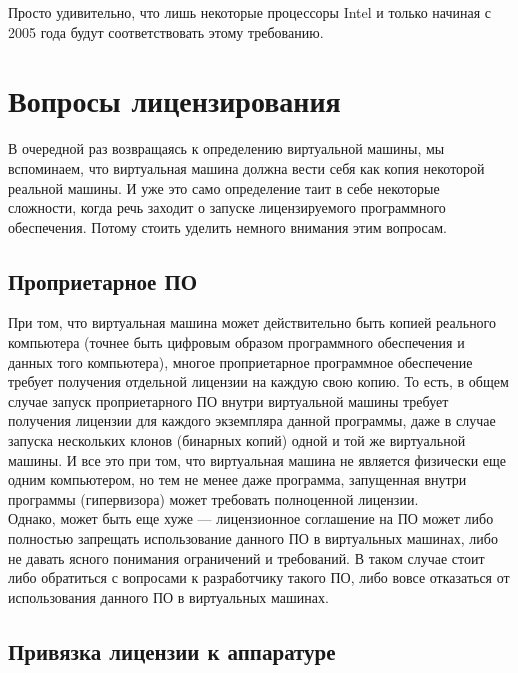 \documentclass[14pt, a4paper]{article}
\begin{document}
Просто удивительно, что лишь некоторые процессоры Intel и только начиная с 2005
года будут соответствовать этому требованию.

\section*{Вопросы лицензирования}

В очередной раз возвращаясь к определению виртуальной машины, мы вспоминаем,
что виртуальная машина должна вести себя как копия некоторой реальной машины. И
уже это само определение таит в себе некоторые сложности, когда речь заходит о
запуске лицензируемого программного обеспечения. Потому стоить уделить немного
внимания этим вопросам.\\

\subsection*{Проприетарное ПО}

При том, что виртуальная машина может действительно быть копией реального
компьютера (точнее быть цифровым образом программного обеспечения и данных
того компьютера), многое проприетарное программное обеспечение требует получения
отдельной лицензии на каждую свою копию. То есть, в общем случае запуск
проприетарного ПО внутри виртуальной машины требует получения лицензии для
каждого экземпляра данной программы, даже в случае запуска нескольких клонов
(бинарных копий) одной и той же виртуальной машины. И все это при том, что
виртуальная машина не является физически еще одним компьютером, но тем не
менее даже программа, запущенная внутри программы (гипервизора) может требовать
полноценной лицензии.\\

Однако, может быть еще хуже — лицензионное соглашение на ПО может либо
полностью запрещать использование данного ПО в виртуальных машинах, либо не
давать ясного понимания ограничений и требований. В таком случае стоит либо
обратиться с вопросами к разработчику такого ПО, либо вовсе отказаться от
использования данного ПО в виртуальных машинах.\\

\subsection*{Привязка лицензии к аппаратуре}
\end{document}
